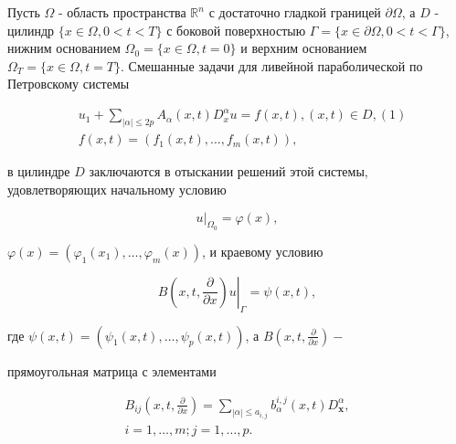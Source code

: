 \documentclass[10pt]{article}
\begin{document}
Пусть $\Omega$ - область пространства $\mathbb{R}^{n}$ с достаточно гладкой границей $\partial \Omega$, а $D$ - цилиндр $\{x \in \Omega, 0<t<T\}$ с боковой поверхностыю $\Gamma=\{x \in \partial \Omega, 0<t<\Gamma\}$, нижним основанием $\Omega_{0}=\{x \in \Omega, t=0\}$ и верхним основанием $\Omega_{T}=\{x \in \Omega, t=T\}$. Смешанные задачи для ливейной параболической по Петровскому системы



\[

\begin{aligned}

& u_{1}+\sum_{|\alpha| \leqslant 2 p} A_{\alpha}(x, t) D_{x}^{\alpha} u=f(x, t),(x, t) \in D,(1) \\

& f(x, t)=\left(f_{1}(x, t), \ldots, f_{m}(x, t)\right) \text {, }

\end{aligned}

\]



в цилиндре $D$ заключаются в отыскании решений этой системы, удовлетворяющих начальному условию



\[

\left.u\right|_{\Omega_{0}}=\varphi(x),

\]



$\varphi(x)=\left(\varphi_{1}\left(x_{1}\right), \ldots, \varphi_{m}(x)\right)$, и краевому условию



\[

\left.B\left(x, t, \frac{\partial}{\partial x}\right) u\right|_{\Gamma}=\psi(x, t),

\]



где $\psi(x, t)=\left(\psi_{1}(x, t), \ldots, \psi_{p}(x, t)\right)$, а $B\left(x, t, \frac{\partial}{\partial x}\right)-$

прямоугольная матрица с элементами



\[

\begin{gathered}

B_{i j}\left(x, t, \frac{\partial}{\partial x}\right)=\sum_{|\alpha| \leqslant a_{i, j}} b_{\alpha}^{i, j}(x, t) D_{\boldsymbol{x}}^{\alpha}, \\

i=1, \ldots, m ; j=1, \ldots, p .

\end{gathered}

\]
\end{document}
